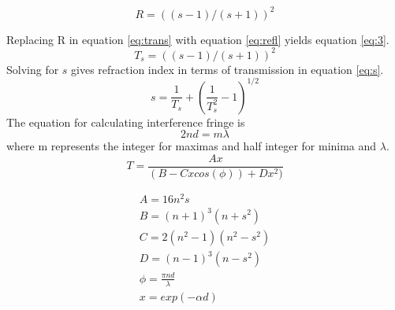 \documentclass[10pt,a4paper]{article}
\begin{document}
\begin{multicols}{2}
\begin{equation}
\label{eq:refl}
R = ((s-1)/(s+1))^2
\end{equation}

Replacing R in equation \ref{eq:trans} with equation \ref{eq:refl} yields equation \ref{eq:3}.
\begin{equation}
\label{eq:3}
T_s = ((s-1)/(s+1))^2
\end{equation}
Solving for $s$ gives refraction index in terms of transmission in equation \ref{eq:s}.
\begin{equation}
\label{eq:s}
s = \frac{1}{T_s} + (\frac{1}{T_s^2}  - 1)^{1/2}
\end{equation}
The equation for calculating interference fringe is
\begin{equation}\label{eq:interfringe}
2nd = m \lambda
\end{equation}
where m represents the integer for maximas and half integer for minima and $\lambda$.
\begin{equation}
\label{eq:TransReg}
T = \dfrac{Ax}{(B-Cx cos(\phi) )+Dx^2)}
\end{equation}

\begin{subequations}\label{eq:TransReg}
    \begin{align}
	A= 16n^2s \label{eq:A}\\
	B = (n+1)^3(n+s^2) \label{eq:B}\\
	C = 2(n^2-1)(n^2-s^2) \label{eq:C}\\
	D = (n-1)^3(n-s^2) \label{eq:D}\\
	\phi = \frac{\pi n d}{ \lambda} \label{eq:phi}\\
	x = exp(-\alpha d) \label{eq:x}
    \end{align}
\end{subequations}


\end{multicols}
\end{document}
